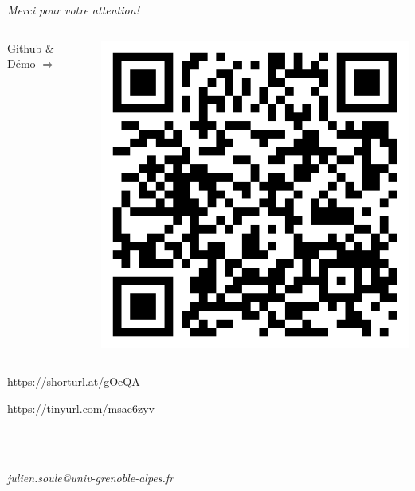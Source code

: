 

\section*{\phantom{Thanks}}

\begin{frame}{}

  \vspace{5ex}

  \centering
  {
    \Huge
    \emph{Merci pour votre attention!}
  }

  \vspace{3ex}

  \begin{columns}

    \hspace{-27ex}

    \begin{column}{0.5\textwidth}
      \raggedleft
      {\Large Github \& Démo $\Longrightarrow$}
    \end{column}

    \hspace{-12ex}

    \begin{column}{0.5\textwidth}
      \includegraphics[width=0.5\linewidth]{figures/demo_qr_code.png}
    \end{column}

  \end{columns}

  \vspace{3ex}

  \centering
  {\Large
    \url{https://shorturl.at/gOeQA}

    \vspace{1ex}

    \url{https://tinyurl.com/msae6zyv}
  }

  \ \\

  \

  \textit{julien.soule@univ-grenoble-alpes.fr}

\end{frame}
